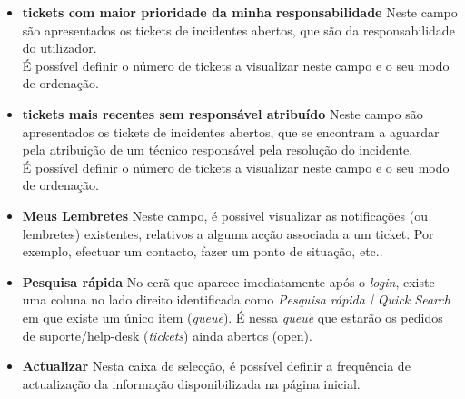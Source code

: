 \begin{itemize}
\item \textbf{tickets com maior prioridade da minha responsabilidade}
\subitem Neste campo são apresentados os tickets de incidentes abertos, que são da responsabilidade do utilizador.\\
É possível definir o número de tickets a visualizar neste campo e o seu modo de ordenação.

\item \textbf{tickets mais recentes sem responsável atribuído}
\subitem Neste campo são apresentados os tickets de incidentes abertos, que se encontram a aguardar pela atribuição de um técnico responsável pela resolução do incidente.\\
É possível definir o número de tickets a visualizar neste campo e o seu modo de ordenação.

\item \textbf{Meus Lembretes}
\subitem Neste campo, é possivel visualizar as notificações (ou lembretes) existentes, relativos a alguma acção associada a um ticket. Por exemplo, efectuar um contacto, fazer um ponto de situação, etc..
\item \textbf{Pesquisa rápida}
\subitem No ecrã que aparece imediatamente após o \emph{login}, existe uma coluna no lado direito identificada como \emph{Pesquisa rápida | Quick Search} em que existe um único item (\emph{queue}).
É nessa \emph{queue} que estarão os pedidos de suporte/help-desk (\emph{tickets}) ainda abertos (open).
\item \textbf{Actualizar}
\subitem Nesta caixa de selecção, é possível definir a frequência de actualização da informação disponibilizada na página inicial.
\end{itemize}



